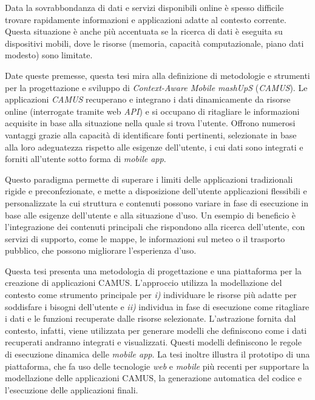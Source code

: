 Data la sovrabbondanza di dati e servizi disponibili online è spesso difficile trovare rapidamente informazioni e applicazioni adatte al contesto corrente. Questa situazione è anche più accentuata se la ricerca di dati è eseguita su dispositivi mobili, dove le risorse (memoria, capacità computazionale, piano dati modesto) sono limitate.

Date queste premesse, questa tesi mira alla definizione di metodologie e strumenti per la progettazione e sviluppo di \emph{Context-Aware Mobile mashUpS} (\emph{CAMUS}). Le applicazioni \emph{CAMUS} recuperano e integrano i dati dinamicamente da  risorse online (interrogate tramite web \emph{API}) e si occupano di ritagliare le informazioni acquisite in base alla situazione nella quale si trova l'utente. Offrono numerosi vantaggi grazie alla capacità di identificare fonti pertinenti, selezionate in base alla loro adeguatezza rispetto alle esigenze dell'utente, i cui dati sono integrati e forniti all'utente sotto forma di \emph{mobile app}.

Questo paradigma permette di superare i limiti delle applicazioni tradizionali rigide e preconfezionate, e mette a disposizione dell'utente applicazioni flessibili e personalizzate la cui struttura e contenuti possono variare in fase di esecuzione in base alle esigenze dell'utente e alla situazione d'uso. Un esempio di beneficio è l'integrazione dei contenuti principali che rispondono alla ricerca dell'utente, con servizi di supporto, come le mappe, le informazioni sul meteo o il trasporto pubblico, che possono migliorare l'esperienza d'uso.

Questa tesi presenta una metodologia di progettazione e una piattaforma per la creazione di applicazioni CAMUS. L'approccio utilizza la modellazione del contesto come strumento principale per  \emph{i)} individuare le risorse più adatte per soddisfare i bisogni dell'utente e \emph{ii)} individua in fase di esecuzione come ritagliare i dati e le funzioni recuperate dalle risorse selezionate. L'astrazione fornita dal contesto, infatti, viene utilizzata per generare modelli che definiscono come i dati recuperati andranno integrati e visualizzati. Questi modelli definiscono le regole di esecuzione dinamica delle \emph{mobile app}. La tesi inoltre illustra il prototipo di una piattaforma, che fa uso delle tecnologie \emph{web} e \emph{mobile} più recenti per supportare la modellazione delle applicazioni CAMUS, la generazione automatica del codice e l'esecuzione delle applicazioni finali.